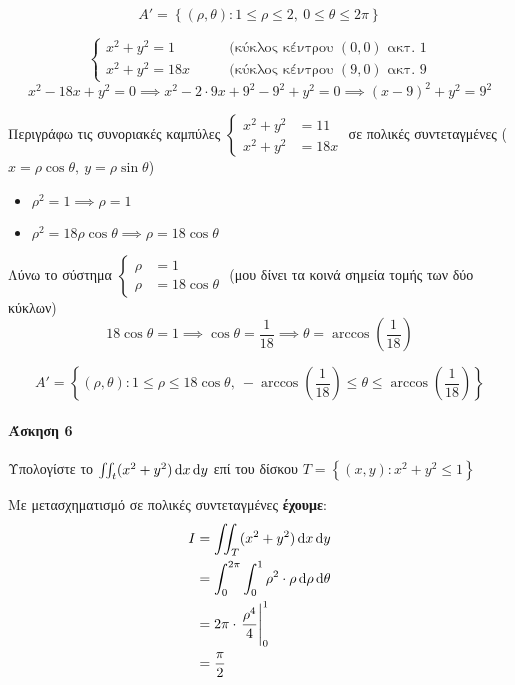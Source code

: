 \documentclass[11pt,a4paper,titlepage,draft]{article}
\begin{document}
\begin{enumparen}
\item
\[
A' =  \left\lbrace  (\rho,\theta): 1 \leq \rho \leq 2,\ 0 \leq \theta \leq 2\pi\right\rbrace
\]
\item
\[
\begin{cases}
x^2+y^2 =1 \qquad & \text{(κύκλος κέντρου $(0,0)$ ακτ. 1} \\
x^2+y^2 =18x \qquad & \text{(κύκλος κέντρου $(9,0)$ ακτ. 9} 
\end{cases}
\]
\[
x^2-18x+y^2=0 \implies
x^2-2\cdot 9 x +9^2-9^2+y^2=0
\implies (x-9)^2+y^2=9^2
\]

Περιγράφω τις συνοριακές καμπύλες
\(
\begin{cases}
x^2+y^2 &=11 \\
x^2+y^2 &=18x  
\end{cases}
\)
σε πολικές συντεταγμένες (\(x=\rho\cos\theta,\ y=\rho\sin\theta\))
\begin{itemize}
\item \(\rho^2=1 \implies \boxed{\rho=1}\)
\item \(\rho^2=18\rho\cos\theta \implies \boxed{\rho =18\cos\theta}\)
\end{itemize}

Λύνω το σύστημα \(
\begin{cases}
\rho &=1 \\
\rho &= 18\cos\theta
\end{cases}
\) (μου δίνει τα κοινά σημεία τομής των δύο κύκλων)
\[
18\cos\theta=1\implies\cos\theta=\frac{1}{18}
\implies \theta = \arccos\left( \frac{1}{18}\right)
\]

\[
A' =  \left\lbrace
(\rho,\theta): 1 \leq \rho \leq 18\cos\theta,\
-\arccos\left( \frac{1}{18}\right) \leq \theta \leq \arccos\left( \frac{1}{18}\right)
 \right\rbrace
\]
\end{enumparen}

\paragraph{Άσκηση 6}
Υπολογίστε το \(\iint_t (x^2+y^2)\dif x \dif y\) επί του δίσκου \(T =  \left\lbrace (x,y): x^2+y^2 \leq 1  \right\rbrace\)

Με μετασχηματισμό σε πολικές συντεταγμένες \textbf{έχουμε}:
\begin{align*}
I &= \iint_T (x^2+y^2)\dif x \dif y \\ &=
\int_0^{2\pi} \int_0^1 \rho^2 \cdot \rho\dif\rho\dif\theta \\
&=
2\pi \cdot \left. \frac{\rho^4}{4} \right|_0^1 \\
&= \frac{\pi}{2}
\end{align*}
\end{document}

